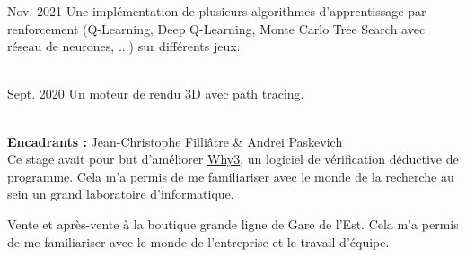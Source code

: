 \documentclass[10pt,a4paper,ragged2e,withhyper]{altacv}
\begin{document}
\begin{paracol}{2}
            {Nov. 2021}{}
            Une implémentation de plusieurs algorithmes d'apprentissage par renforcement
            (Q-Learning, Deep Q-Learning, Monte Carlo Tree Search avec réseau de neurones, ...)
            sur différents jeux.\\
            \vspace{4pt}
            \\
            \vspace{4pt}
            \divider
            

            {Sept. 2020}{}
            Un moteur de rendu 3D avec path tracing.\\
            \vspace{4pt}
            \\
            \vspace{4pt}

            \textbf{Encadrants :} Jean-Christophe Filliâtre \& Andrei Paskevich\\
            \vspace{3pt}
            Ce stage avait pour but d'améliorer \href{http://why3.lri.fr/}{Why3}, un logiciel de vérification déductive de programme.
            Cela m'a permis de me familiariser avec le monde de la recherche au sein un grand laboratoire d'informatique.\\

            \divider

            Vente et après-vente à la boutique grande ligne de Gare de l'Est. Cela m'a permis de me familiariser avec le monde de l'entreprise et le travail d'équipe.

    \end{paracol}
\end{document}
